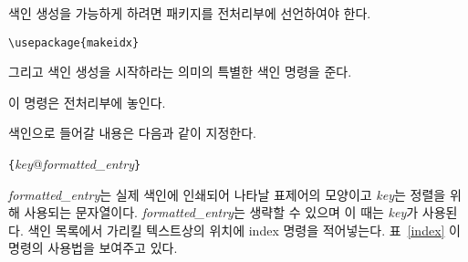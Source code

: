 색인 생성을 가능하게 하려면  패키지를 전처리부에 선언하여야 한다.
\begin{lscommand}
\verb|\usepackage{makeidx}|
\end{lscommand}
\noindent 그리고 색인 생성을 시작하라는 의미의 특별한 색인 명령을 준다.
\begin{lscommand}
\end{lscommand}
\noindent 이 명령은 전처리부에 놓인다.

색인으로 들어갈 내용은 다음과 같이 지정한다.
\begin{lscommand}
  \verb|{|\emph{key}@\emph{formatted\_entry}\verb|}|
\end{lscommand}
\noindent
\emph{formatted\_entry}는 실제 색인에 인쇄되어 나타날 표제어의 모양이고 \emph{key}는 정렬을 위해 사용되는 문자열이다. \emph{formatted\_entry}는 생략할 수 있으며 이 때는 \emph{key}가 사용된다.
색인 목록에서 가리킬 텍스트상의 위치에 index 명령을 적어넣는다. 표~\ref{index}\가 
이 명령의 사용법을 보여주고 있다.

